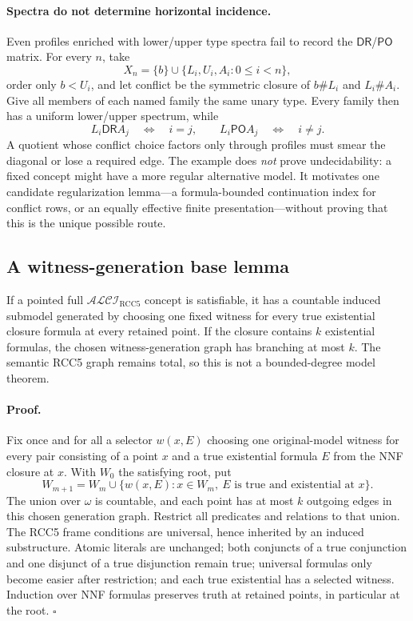 \documentclass[11pt]{article}
\newcommand{\Logic}{\ensuremath{\mathcal{ALCI}_{\mathrm{RCC5}}}}
\newcommand{\PO}{\ensuremath{\mathsf{PO}}}
\newcommand{\DR}{\ensuremath{\mathsf{DR}}}
\begin{document}
\paragraph{Spectra do not determine horizontal incidence.}
Even profiles enriched with lower/upper type spectra fail to record the
\DR/\PO{} matrix.  For every \(n\), take
\[
X_n=\{b\}\cup\{L_i,U_i,A_i:0\le i<n\},
\]
order only \(b<U_i\), and let conflict be the symmetric closure of
\(b\#L_i\) and \(L_i\#A_i\).  Give all members of each named family the same
unary type.  Every family then has a uniform lower/upper spectrum, while
\[
L_i\DR A_j\quad\Longleftrightarrow\quad i=j,
\qquad
L_i\PO A_j\quad\Longleftrightarrow\quad i\ne j.
\]
A quotient whose conflict choice factors only through profiles must smear the
diagonal or lose a required edge.  The example does \emph{not} prove
undecidability: a fixed concept might have a more regular alternative model.
It motivates one candidate regularization lemma---a formula-bounded
continuation index for conflict rows, or an equally effective finite
presentation---without proving that this is the unique possible route.

\newpage
\subsection{A witness-generation base lemma}

\begin{resultbox}
If a pointed full \Logic{} concept is satisfiable, it has a countable induced
submodel generated by choosing one fixed witness for every true existential
closure formula at every retained point.  If the closure contains \(k\)
existential formulas, the chosen witness-generation graph has branching at most
\(k\).  The semantic RCC5 graph remains total, so this is not a bounded-degree
model theorem.
\end{resultbox}

\paragraph{Proof.}
Fix once and for all a selector \(w(x,E)\) choosing one original-model witness
for every pair consisting of a point \(x\) and a true existential formula \(E\)
from the NNF closure at \(x\).  With \(W_0\) the satisfying root, put
\[
W_{m+1}=W_m\cup\{w(x,E):x\in W_m,\ E\text{ is true and existential at }x\}.
\]
The union over \(\omega\) is countable, and each point has at most \(k\) outgoing
edges in this chosen generation graph.
Restrict all predicates and relations to that union.  The RCC5 frame conditions
are universal, hence inherited by an induced substructure.  Atomic literals are
unchanged; both conjuncts of a true conjunction and one disjunct of a true
disjunction remain true; universal
formulas only become easier after restriction; and each true existential has a
selected witness.  Induction over NNF formulas preserves truth at retained
points, in particular at the root. \(\square\)
\end{document}

